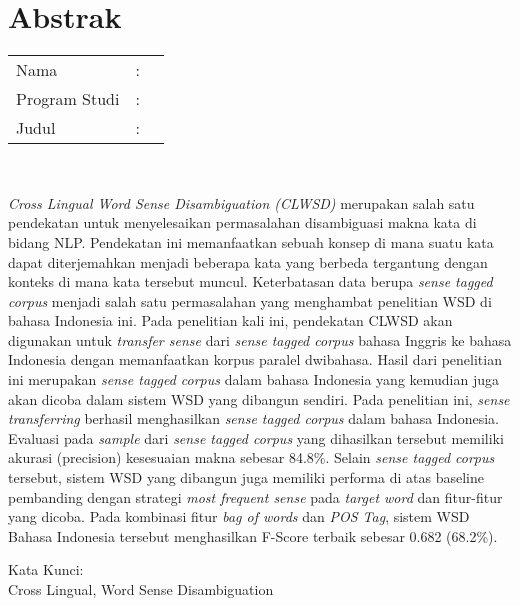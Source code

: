 %
%
%

\chapter*{Abstrak}

\vspace*{0.2cm}

\noindent \begin{tabular}{l l p{10cm}}
	Nama&: & \penulis \\
	Program Studi&: & \program \\
	Judul&: & \judul \\
\end{tabular} \\ 

\vspace*{0.5cm}

\noindent
\textit{Cross Lingual Word Sense Disambiguation (CLWSD)} merupakan salah satu pendekatan untuk menyelesaikan permasalahan disambiguasi makna kata di bidang NLP. Pendekatan ini memanfaatkan sebuah konsep di mana suatu kata dapat diterjemahkan menjadi beberapa kata yang berbeda tergantung dengan konteks di mana kata tersebut muncul. Keterbatasan data berupa \textit{sense tagged corpus} menjadi salah satu permasalahan yang menghambat penelitian WSD di bahasa Indonesia ini. Pada penelitian kali ini, pendekatan CLWSD akan digunakan untuk \textit{transfer sense} dari \textit{sense tagged corpus} bahasa Inggris ke bahasa Indonesia dengan memanfaatkan korpus paralel dwibahasa. Hasil dari penelitian ini merupakan \textit{sense tagged corpus} dalam bahasa Indonesia yang kemudian juga akan dicoba dalam sistem WSD yang dibangun sendiri. Pada penelitian ini, \textit{sense transferring} berhasil menghasilkan \textit{sense tagged corpus} dalam bahasa Indonesia. Evaluasi pada \textit{sample} dari \textit{sense tagged corpus} yang dihasilkan tersebut memiliki akurasi (precision) kesesuaian makna sebesar 84.8\%. Selain \textit{sense tagged corpus} tersebut, sistem WSD yang dibangun juga memiliki performa di atas baseline pembanding dengan strategi \textit{most frequent sense} pada \textit{target word} dan fitur-fitur yang dicoba. Pada kombinasi fitur \textit{bag of words} dan \textit{POS Tag}, sistem WSD Bahasa Indonesia tersebut menghasilkan F-Score terbaik sebesar 0.682 (68.2\%).


\vspace*{0.2cm}

\noindent Kata Kunci: \\ 
\noindent Cross Lingual, Word Sense Disambiguation

\newpage